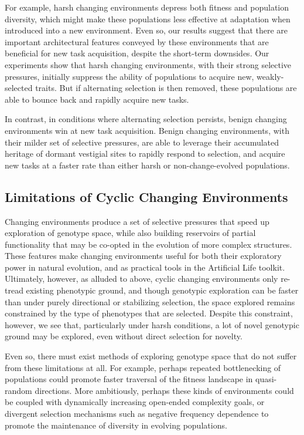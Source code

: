 \documentclass[10pt,letterpaper,final]{article}
\begin{document}
For example, harsh changing environments depress both fitness and population diversity, which might make these populations less effective at adaptation when introduced into a new environment. Even so, our results suggest that there are important architectural features conveyed by these environments that are beneficial for new task acquisition, despite the short-term downsides. Our experiments show that harsh changing environments, with their strong selective pressures, initially suppress the ability of populations to acquire new, weakly-selected traits. But if alternating selection is then removed, these populations are able to bounce back and rapidly acquire new tasks. 

In contrast, in conditions where alternating selection persists, benign changing environments win at new task acquisition. Benign changing environments, with their milder set of selective pressures, are able to leverage their accumulated heritage of dormant vestigial sites to rapidly respond to selection, and acquire new tasks at a faster rate than either harsh or non-change-evolved populations. 

\subsection*{Limitations of Cyclic Changing Environments}
Changing environments produce a set of selective pressures that speed up exploration of genotype space, while also building reservoirs of partial functionality that may be co-opted in the evolution of more complex structures. These features make changing environments useful for both their exploratory power in natural evolution, and as practical tools in the Artificial Life toolkit.
Ultimately, however, as alluded to above, cyclic changing environments only re-tread existing phenotypic ground, and though genotypic exploration can be faster than under purely directional or stabilizing selection, the space explored remains constrained by the type of phenotypes that are selected. Despite this constraint, however, we see that, particularly under harsh conditions, a lot of novel genotypic ground may be explored, even without direct selection for novelty. 

Even so, there must exist methods of exploring genotype space that do not suffer from these limitations at all.
For example, perhaps repeated bottlenecking of populations could promote faster traversal of the fitness landscape in quasi-random directions. More ambitiously, perhaps these kinds of environments could be coupled with dynamically increasing open-ended complexity goals, or divergent selection mechanisms such as negative frequency dependence to promote the maintenance of diversity in evolving populations.
\end{document}
